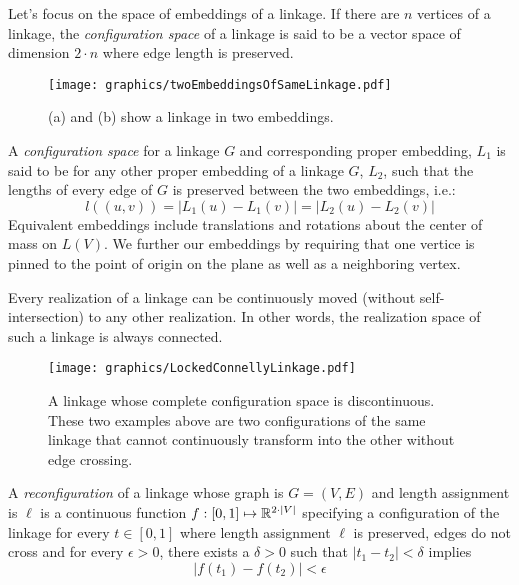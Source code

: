 Let's focus on the space of embeddings of a linkage. If there are $n$ vertices of a linkage, 
the \textit{configuration space} of a linkage is said to be a vector space of dimension $2 \cdot n$ 
where edge length is preserved.  
\begin{figure}[!h]
\begin{center}
\texttt{[image: graphics/twoEmbeddingsOfSameLinkage.pdf]}
\end{center} 
\caption{(a) and (b) show a linkage in two embeddings.}
\label{fig:configuration-3}
\end{figure}
A \textit{configuration space} for a linkage $G$ and corresponding proper embedding, $L_1$ is said 
to be for any other proper embedding of a linkage $G$, $L_2$, such that the lengths 
of every edge of $G$ is preserved between the two embeddings, i.e.: 
$$l\left( \left(u,v\right) 
\right) = \left\vert 
L_1(u) - L_1(v) \right\vert = \left\vert L_2(u) - L_2(v) \right\vert$$
Equivalent embeddings include translations and rotations about the center of mass on $L(V)$.  We 
further our embeddings by requiring that one vertice is pinned to the point of origin on the plane 
as well as a neighboring vertex.

\begin{thm}
 Every realization of a linkage can be continuously moved (without 
self-intersection) to any other 
realization. In other words, the realization space of such a linkage is always connected.
\end{thm}

\begin{figure}[!h]
\begin{center}
\texttt{[image: graphics/LockedConnellyLinkage.pdf]}
\end{center} 
\caption{A linkage whose complete configuration space is discontinuous.  These two examples above 
are two configurations of the same linkage that cannot continuously transform into the other 
without edge crossing.}
\label{fig:configuration-4}
\end{figure}
A \textit{reconfiguration} of a linkage whose graph is $G=(V,E)$ and length assignment is $\ell$ is 
a continuous function $f: [0,1] \mapsto {\mathbb{R}}^{2 \cdot \vert V \vert}$ specifying a configuration of 
the linkage for every $t \in [0,1]$ where length assignment $\ell$ is preserved, edges do not cross 
and for every $\epsilon > 0$, there exists a $\delta > 0$ such that $\vert t_1 - t_2 \vert < 
\delta$ implies 
$$\left\vert f\left( t_1 \right) - f\left( t_2 \right) \right\vert < \epsilon$$
